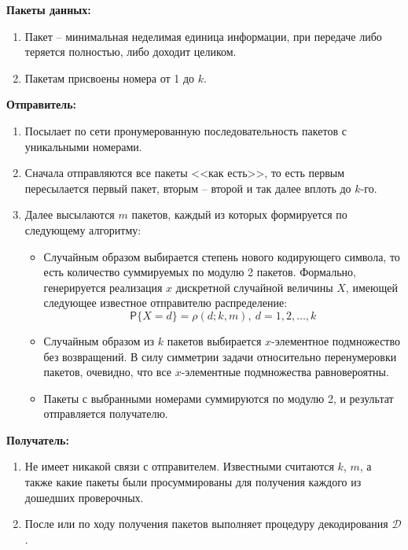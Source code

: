 \noindent\textbf{Пакеты данных:} 
    \begin{enumerate}
        \item Пакет -- минимальная неделимая единица информации, при передаче либо
        теряется полностью, либо доходит целиком.
        \item Пакетам присвоены номера от 1 до $k$.
    \end{enumerate}
\noindent\textbf{Отправитель:} 
    \begin{enumerate}
        \item Посылает по сети пронумерованную последовательность пакетов
        с уникальными номерами.
        \item Сначала отправляются все пакеты <<как есть>>, то есть
        первым пересылается первый пакет, вторым -- второй и так далее
        вплоть до $k$-го. 
        \item Далее высылаются $m$ пакетов, каждый из которых 
        формируется по следующему алгоритму: 
        \begin{itemize}
            \item Случайным образом выбирается степень нового кодирующего символа, то есть
            количество суммируемых по модулю 2 пакетов. Формально, генерируется реализация $x$ 
            дискретной случайной величины $X$, имеющей следующее известное отправителю
            распределение:
            \[\mathsf{P}\{X=d\}=\rho(d; k, m), \: d = 1, 2, \dots, k\] 
            \item Случайным образом из $k$ пакетов выбирается 
            $x$-элементное подмножество без возвращений. В силу симметрии задачи 
            относительно перенумеровки пакетов, очевидно, что 
            все $x$-элементные подмножества равновероятны.
            \item Пакеты с выбранными номерами суммируются по модулю 2,
            и результат отправляется получателю. 
        \end{itemize}
    \end{enumerate}
\noindent\textbf{Получатель:}
    \begin{enumerate}
        \item Не имеет никакой связи с отправителем. Известными
        считаются $k$, $m$, а также какие пакеты были просуммированы
        для получения каждого из дошедших проверочных. 
        \item После или по ходу получения пакетов выполняет 
        процедуру декодирования $\mathcal D$.
    \end{enumerate}


